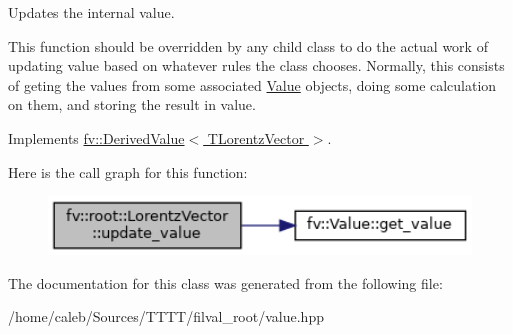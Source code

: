 Updates the internal value. 

This function should be overridden by any child class to do the actual work of updating value based on whatever rules the class chooses. Normally, this consists of geting the values from some associated \hyperlink{classfv_1_1Value}{Value} objects, doing some calculation on them, and storing the result in value. 

Implements \hyperlink{classfv_1_1DerivedValue_ae59e80a98eb74b95d8961bfe12ee5ec2}{fv\+::\+Derived\+Value$<$ T\+Lorentz\+Vector $>$}.

Here is the call graph for this function\+:
\nopagebreak
\begin{figure}[H]
\begin{center}
\leavevmode
\includegraphics[width=350pt]{classfv_1_1root_1_1LorentzVector_aeb17320a2024bd189dad4117cf1f54fb_cgraph}
\end{center}
\end{figure}


The documentation for this class was generated from the following file\+:\begin{DoxyCompactItemize}
\item 
/home/caleb/\+Sources/\+T\+T\+T\+T/filval\+\_\+root/value.\+hpp\end{DoxyCompactItemize}
